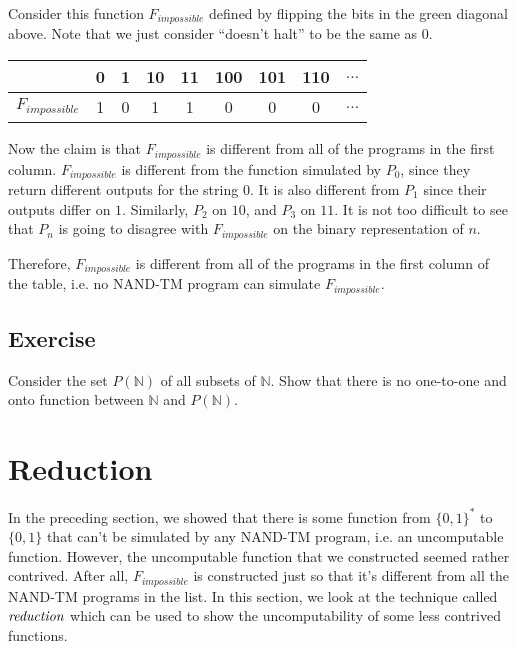 \documentclass[11pt]{article}
\theoremstyle{definition}
\theoremstyle{remark}
\begin{document}
Consider this function $F_{impossible}$ defined by flipping the bits in the green diagonal above.
Note that we just consider ``doesn't halt'' to be the same as 0.

\begin{center}
    \begin{tabular}{c|cccccccc}
        & 0 & 1 & 10 & 11 & 100 & 101 & 110 & $\dots$ \\ 
        \hline
        $F_{impossible}$ & \cellcolor{green!20}1 & \cellcolor{green!20}0 & \cellcolor{green!20}1 & \cellcolor{green!20}1
        &\cellcolor{green!20}0 & \cellcolor{green!20}0 & \cellcolor{green!20}0 & $\dots$
    \end{tabular}
\end{center}

Now the claim is that $F_{impossible}$ is different from all of the programs in the first column. $F_{impossible}$ is different from
the function simulated by
$P_0$, since they return different outputs for the string $0$. It is also different from $P_1$ since their outputs differ on $1$. 
Similarly, $P_2$ on $10$, and $P_3$ on $11$. It is not too difficult to see that $P_n$ is going to disagree with $F_{impossible}$ on the
binary representation of $n$.

Therefore, $F_{impossible}$ is different from all of the programs in the first column of the table, i.e.
no NAND-TM program can simulate $F_{impossible}$.

\subsection{Exercise}
Consider the set $P(\mathbb{N})$ of all subsets of $\mathbb{N}$. Show that there is no one-to-one and onto function between 
$\mathbb{N}$ and $P(\mathbb{N})$. 

\section{Reduction}
In the preceding section, we showed that there is some function from $\{0, 1\}^*$ to $\{0, 1\}$ that can't be simulated by
any NAND-TM program, i.e. an uncomputable function. However, the uncomputable function that we constructed seemed rather contrived.
After all, $F_{impossible}$ is constructed just so that it's different from all the NAND-TM programs in the list. In this section,
we look at the technique called $\emph{reduction}$ which can be used to show the uncomputability of some less contrived functions.
\end{document}
